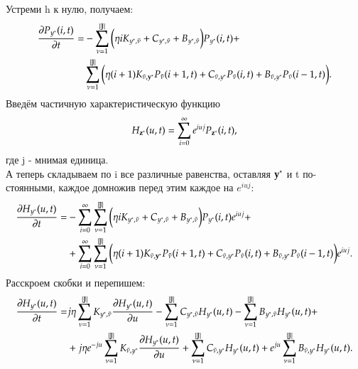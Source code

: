 Устреми h к нулю, получаем:
\begin{align*} 
    \pdv{P_{y^*}(i, t)}{t} =
    &- \sum^{|\mathbb{J}|}_{\nu=1}
        \bigg(\eta i K_{y^*, \tilde{\nu}}
        + C_{y^*, \tilde{\nu}} 
        + B_{{y^*}, \tilde{\nu}}\bigg)
        P_{y^*}(i, t)+\\
    &\sum^{|\mathbb{J}|}_{\nu=1} 
        \bigg(\eta (i+1) K_{\tilde{\nu}, \bold{y}^*}P_{\bold{\tilde{\nu}}}(i+1, t)
        + C_{\tilde{\nu}, y^*}P_{\tilde{\nu}}(i, t) 
        + B_{\tilde{\nu}, y^*}P_{\tilde{\nu}}(i-1, t) \bigg).
\end{align*} 
Введём частичную характеристическую функцию \[H_{\bold{z}^*}(u,t)=\sum_{i=0}^\infty e^{iuj}P_{\bold{z}^*}(i, t),\] 
где j - мнимая единица.\\
А теперь складываем по i все различные равенства, оставляя \(\bold{y}^*\) и t по-
стоянными, каждое домножив перед этим каждое на \(e^{iuj}\):
\begin{align*}
    \pdv{H_{y^*}(u, t)}{t} =                   
    &- \sum_{i = 0}^{\infty}\sum^{|\mathbb{J}|}_{\nu=1}
        \bigg(\eta i K_{y^*, \tilde{\nu}}
        + C_{y^*, \tilde{\nu}} 
        + B_{{y^*}, \tilde{\nu}}\bigg)
        P_{y^*}(i, t)e^{iuj}+\\
    &+\sum_{i = 0}^{\infty}\sum^{|\mathbb{J}|}_{\nu=1} 
        \bigg(\eta (i+1) K_{\tilde{\nu}, \bold{y}^*}P_{\bold{\tilde{\nu}}}(i+1, t)
        + C_{\tilde{\nu}, y^*}P_{\tilde{\nu}}(i, t) 
        + B_{\tilde{\nu}, y^*}P_{\tilde{\nu}}(i-1, t) \bigg)e^{iuj}.     
\end{align*}
Расскроем скобки и перепишем:
\begin{align*} 
    \pdv{H_{y^*}(u, t)}{t} =                   
	& j\eta \sum^{|\mathbb{J}|}_{\nu=1} K_{y^*, \tilde{\nu}}\pdv{H_{y^*}(u, t)}{u}
        - \sum^{|\mathbb{J}|}_{\nu=1}C_{y^*, \tilde{\nu}} H_{y^*}(u, t)
        - \sum^{|\mathbb{J}|}_{\nu=1}B_{{y^*}, \tilde{\nu}}H_{y^*}(u, t)+\\
	&+j\eta e^{-ju} \sum^{|\mathbb{J}|}_{\nu=1} K_{\tilde{\nu}, y^*}\pdv{H_{y^*}(u, t)}{u}
        + \sum^{|\mathbb{J}|}_{\nu=1}C_{\tilde{\nu}, y^*}H_{y^*}(u, t) 
	+ e^{ju}\sum^{|\mathbb{J}|}_{\nu=1}B_{\tilde{\nu}, y^*}H_{y^*}(u, t).     
\end{align*}
